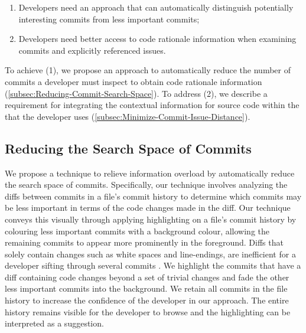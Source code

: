 \begin{enumerate}[label={(\arabic*)}]
    \item Developers need an approach that can automatically distinguish potentially interesting commits from less important commits;
    \item Developers need better access to code rationale information when examining commits and explicitly referenced issues.
\end{enumerate}

To achieve (1), we propose an approach to automatically reduce the number of commits a developer must inspect to obtain code rationale information (\autoref{subsec:Reducing-Commit-Search-Space}).
To address (2), we describe a requirement for integrating the contextual information for source code within the  that the developer uses (\autoref{subsec:Minimize-Commit-Issue-Distance}).

\subsection{Reducing the Search Space of Commits}
\label{subsec:Reducing-Commit-Search-Space}

We propose a technique to relieve information overload by automatically reduce the search space of commits.
Specifically, our technique involves analyzing the diffs between commits in a file's commit history to determine which commits may be less important in terms of the code changes made in the diff.
Our technique conveys this visually through applying highlighting on a file's commit history by colouring less important commits with a background colour, allowing the remaining commits to appear more prominently in the foreground.
Diffs that solely contain changes such as white spaces and line-endings, are inefficient for a developer sifting through several commits \cite{codoban_software_2015}.
We highlight the commits that have a diff containing code changes beyond a set of trivial changes and fade the other less important commits into the background.
We retain all commits in the file history to increase the confidence of the developer in our approach.
The entire history remains visible for the developer to browse and the highlighting can be interpreted as a suggestion.

